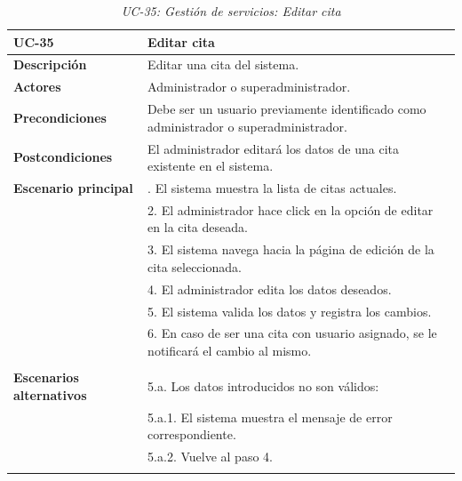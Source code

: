 \begin{table}[H]
  \begin{center}
    \begin{tabularx}{16.4cm}{|l|X|}
      \hline
      \textbf{UC-35} & \textbf{Editar cita}\\
      \hline
      \textbf{Descripción} & Editar una cita del sistema.\\
      \hline
      \textbf{Actores} & Administrador o superadministrador.\\
      \hline
      \textbf{Precondiciones} & Debe ser un usuario previamente identificado como administrador o superadministrador.\\
      \hline
      \textbf{Postcondiciones} & El administrador editará los datos de una cita existente en el sistema.\\
      \hline
      \textbf{Escenario principal} & \smallskip 1. El sistema muestra la lista de citas actuales.\\
      & 2. El administrador hace click en la opción de editar en la cita deseada.\\
      & 3. El sistema navega hacia la página de edición de la cita seleccionada.\\
      & 4. El administrador edita los datos deseados.\\
      & 5. El sistema valida los datos y registra los cambios.\\
      & 6. En caso de ser una cita con usuario asignado, se le notificará el cambio al mismo.\\
      & \\
      \hline
      \textbf{Escenarios alternativos} & \smallskip 5.a. Los datos introducidos no son válidos:\\
      & \hspace{0.3cm} 5.a.1. El sistema muestra el mensaje de error correspondiente.\\
      & \hspace{0.3cm} 5.a.2. Vuelve al paso 4.\\
      & \\
      \hline
    \end{tabularx}
    \caption{\textit{UC-35: Gestión de servicios: Editar cita}}
    \label{tab:CU-editar-cita}
  \end{center}
\end{table}


